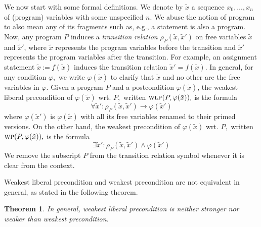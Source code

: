 \documentclass[times]{elsarticle}
\newtheorem{theorem}{Theorem}
\newcommand{\passign}{\mbox{:=}}
\newcommand{\WP}{\mbox{\textsc{wp}}}
\newcommand{\WLP}{\mbox{\textsc{wlp}}}
\begin{document}
We now start with some formal definitions. We denote by $\tilde{x}$ a
sequence $x_0, \ldots, x_n$ of (program) variables with some
unspecified $n.$ We abuse the notion of program to also mean any of
its fragments such as, e.g., a statement is also a program. Now, any
program $P$ induces a \emph{transition relation\/} $\rho_P(\tilde{x},
\tilde{x}')$ on free variables $\tilde{x}$ and $\tilde{x}'$, where
$\tilde{x}$ represents the program variables before the transition and
$\tilde{x}'$ represents the program variables after the transition.
For example, an assignment statement $\tilde{x} ~\passign~
f(\tilde{x})$ induces the transition relation $\tilde{x}' =
f(\tilde{x}).$ In general, for any condition $\varphi,$ we write
$\varphi(\tilde{x})$ to clarify that $\tilde{x}$ and no other are the
free variables in $\varphi.$ Given a program $P$ and a postcondition
$\varphi(\tilde{x})$, the weakest liberal precondition of
$\varphi(\tilde{x})$ wrt. $P,$ written
$\WLP(P, \varphi(\tilde{x})),$ is the formula
\[
\forall \tilde{x}' : \rho_P(\tilde{x},\tilde{x}') \rightarrow \varphi(\tilde{x}')
\]
where $\varphi(\tilde{x}')$ is $\varphi(\tilde{x})$ with all
its free variables renamed to their primed versions. On the other hand,
the weakest precondition of $\varphi(\tilde{x})$ wrt. $P,$ written
$\WP(P, \varphi(\tilde{x})),$ is the formula
\[
\exists \tilde{x}' : \rho_P(\tilde{x},\tilde{x}') \wedge \varphi(\tilde{x}')
\]
We remove the subscript $P$ from the transition relation symbol
whenever it is clear from the context.

Weakest liberal precondition and weakest precondition are not
equivalent in general, as stated in the following theorem.
\begin{theorem} \label{theorem:neither}
In general, weakest liberal precondition is neither stronger nor weaker than weakest precondition.
\end{theorem}
\end{document}
